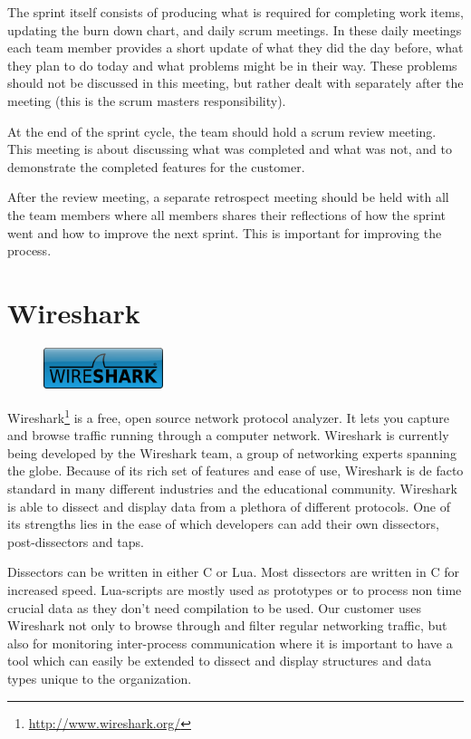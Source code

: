 The sprint itself consists of producing what is required for completing work
items, updating the burn down chart, and daily scrum meetings. In these daily
meetings each team member provides a short update of what they did the day
before, what they plan to do today and what problems might be in their way.
These problems should not be discussed in this meeting, but rather dealt with
separately after the meeting (this is the scrum masters responsibility).

At the end of the sprint cycle, the team should hold a scrum review meeting.
This meeting is about discussing what was completed and what was not, and to
demonstrate the completed features for the customer.

After the review meeting, a separate retrospect meeting should be held with all
the team members where all members shares their reflections of how the sprint
went and how to improve the next sprint. This is important for improving the
process.


\section{Wireshark}
\label{sec:pre:wireshark}
\begin{figure}
	\begin{center}
	\vspace{-30pt}
		\includegraphics[width=3.5cm]{./planning/img/wireshark_logo}
	\vspace{-30pt}
	\end{center}
\end{figure}
Wireshark\footnote{\url{http://www.wireshark.org/}} is a free, open source
network protocol analyzer. It lets you capture and browse traffic running
through a computer network. Wireshark is currently being developed by the
Wireshark team, a group of networking experts spanning the globe. Because of
its rich set of features and ease of use, Wireshark is de facto standard in
many different industries and the educational community. Wireshark is able to
dissect and display data from a plethora of different protocols. One of its
strengths lies in the ease of which developers can add their own dissectors,
post-dissectors and taps.

Dissectors can be written in either C or Lua. Most dissectors are written in C
for increased speed. Lua-scripts are mostly used as prototypes or to process
non time crucial data as they don't need compilation to be used. Our customer
uses Wireshark not only to browse through and filter regular networking
traffic, but also for monitoring inter-process communication where it is
important to have a tool which can easily be extended to dissect and display
structures and data types unique to the organization.

